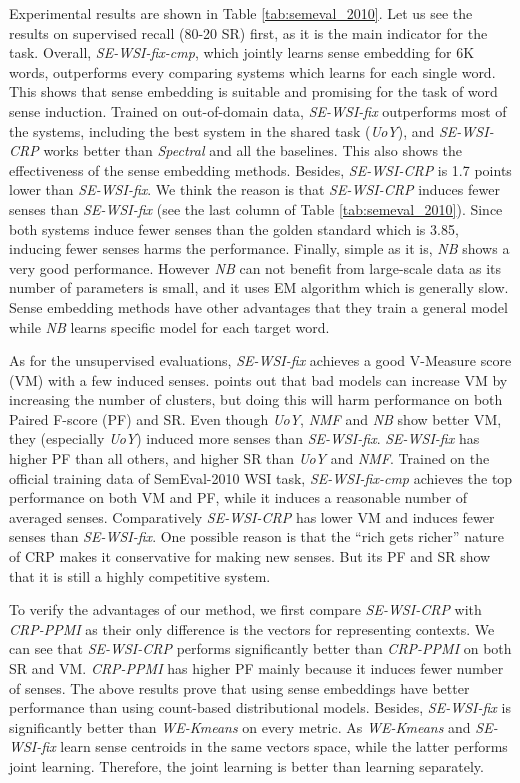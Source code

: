 \documentclass[11pt]{article}
\begin{document}
Experimental results are shown in Table \ref{tab:semeval_2010}. Let us see the results on supervised recall (80-20 SR) first, as it is the main indicator for the task. 
Overall, \emph{SE-WSI-fix-cmp}, which jointly learns sense embedding for 6K words, outperforms every comparing systems which learns for each single word. 
This shows that sense embedding is suitable and promising for the task of word sense induction.
Trained on out-of-domain data, \emph{SE-WSI-fix} outperforms most of the systems, including the best system in the shared task (\emph{UoY}), and
\emph{SE-WSI-CRP} works better than \emph{Spectral} and all the baselines.
This also shows the effectiveness of the sense embedding methods.
Besides, \emph{SE-WSI-CRP} is 1.7 points lower than \emph{SE-WSI-fix}.
We think the reason is that \emph{SE-WSI-CRP} induces fewer senses than \emph{SE-WSI-fix} (see the last column of Table \ref{tab:semeval_2010}).
Since both systems induce fewer senses than the golden standard which is 3.85, inducing fewer senses harms the performance.
Finally, simple as it is, \emph{NB} shows a very good performance.
However \emph{NB} can not benefit from large-scale data as its number of parameters is small,
and it uses EM algorithm which is generally slow. Sense embedding methods have other advantages that they train a general model while \emph{NB} learns specific model for each target word.


As for the unsupervised evaluations, \emph{SE-WSI-fix} achieves a good V-Measure score (VM) with a few induced senses. 
 points out that bad models can increase VM by increasing the number of clusters, but doing this will harm performance on both Paired F-score (PF) and SR.
Even though \emph{UoY}, \emph{NMF} and \emph{NB} show better VM, they (especially \emph{UoY}) induced more senses than \emph{SE-WSI-fix}.
\emph{SE-WSI-fix} has higher PF than all others, and higher SR than \emph{UoY} and \emph{NMF}.
Trained on the official training data of SemEval-2010 WSI task, \emph{SE-WSI-fix-cmp} achieves the top performance on both VM and PF, while it induces a reasonable number of averaged senses.
Comparatively \emph{SE-WSI-CRP} has lower VM and induces fewer senses than \emph{SE-WSI-fix}.
One possible reason is that the ``rich gets richer'' nature of CRP makes it conservative for making new senses.
But its PF and SR show that it is still a highly competitive system.



To verify the advantages of our method, we first compare \emph{SE-WSI-CRP} with \emph{CRP-PPMI} as their only difference is the vectors for representing contexts.
We can see that \emph{SE-WSI-CRP} performs significantly better than \emph{CRP-PPMI} on both SR and VM.
\emph{CRP-PPMI} has higher PF mainly because it induces fewer number of senses.
The above results prove that using sense embeddings have better performance than using count-based distributional models.
Besides, \emph{SE-WSI-fix} is significantly better than \emph{WE-Kmeans} on every metric.
As \emph{WE-Kmeans} and \emph{SE-WSI-fix} learn sense centroids in the same vectors space, while the latter performs joint learning.
Therefore, the joint learning is better than learning separately.
\end{document}
